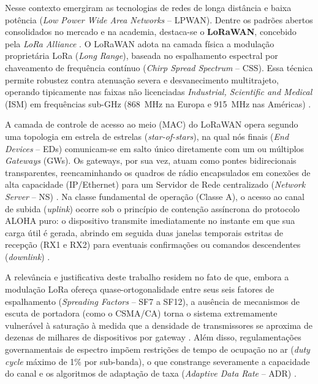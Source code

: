 \documentclass[12pt]{article}
\begin{document}
Nesse contexto emergiram as tecnologias de redes de longa distância e baixa potência (\textit{Low Power Wide Area Networks} -- LPWAN). Dentre os padrões abertos consolidados no mercado e na academia, destaca-se o \textbf{LoRaWAN}, concebido pela \textit{LoRa Alliance} \cite{lorawan_spec_v103}. O LoRaWAN adota na camada física a modulação proprietária LoRa (\textit{Long Range}), baseada no espalhamento espectral por chaveamento de frequência contínuo (\textit{Chirp Spread Spectrum} -- CSS). Essa técnica permite robustez contra atenuação severa e desvanecimento multitrajeto, operando tipicamente nas faixas não licenciadas \textit{Industrial, Scientific and Medical} (ISM) em frequências sub-GHz (868~MHz na Europa e 915~MHz nas Américas) \cite{magrin2017performance}.

A camada de controle de acesso ao meio (MAC) do LoRaWAN opera segundo uma topologia em estrela de estrelas (\textit{star-of-stars}), na qual nós finais (\textit{End Devices} -- EDs) comunicam-se em salto único diretamente com um ou múltiplos \textit{Gateways} (GWs). Os gateways, por sua vez, atuam como pontes bidirecionais transparentes, reencaminhando os quadros de rádio encapsulados em conexões de alta capacidade (IP/Ethernet) para um Servidor de Rede centralizado (\textit{Network Server} -- NS) \cite{lorawan_spec_v103}. Na classe fundamental de operação (Classe A), o acesso ao canal de subida (\textit{uplink}) ocorre sob o princípio de contenção assíncrona do protocolo ALOHA puro: o dispositivo transmite imediatamente no instante em que sua carga útil é gerada, abrindo em seguida duas janelas temporais estritas de recepção (RX1 e RX2) para eventuais confirmações ou comandos descendentes (\textit{downlink}) \cite{adelantado2017understanding}.

A relevância e justificativa deste trabalho residem no fato de que, embora a modulação LoRa ofereça quase-ortogonalidade entre seus seis fatores de espalhamento (\textit{Spreading Factors} -- SF7 a SF12), a ausência de mecanismos de escuta de portadora (como o CSMA/CA) torna o sistema extremamente vulnerável à saturação à medida que a densidade de transmissores se aproxima de dezenas de milhares de dispositivos por gateway \cite{bor2016lora}. Além disso, regulamentações governamentais de espectro impõem restrições de tempo de ocupação no ar (\textit{duty cycle} máximo de 1\% por sub-banda), o que constrange severamente a capacidade do canal e os algoritmos de adaptação de taxa (\textit{Adaptive Data Rate} -- ADR) \cite{magrin2017performance}.
\end{document}
